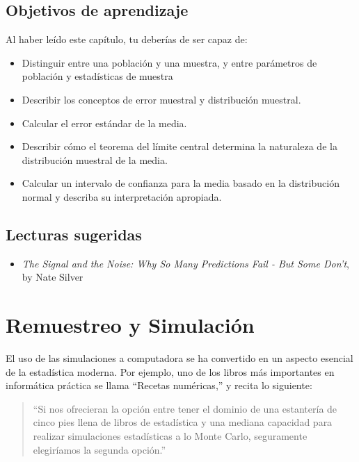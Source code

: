 \documentclass[
  12pt,
]{book}
\providecommand{\tightlist}{%
  \setlength{\itemsep}{0pt}\setlength{\parskip}{0pt}}
\theoremstyle{definition}
\theoremstyle{definition}
\theoremstyle{definition}
\theoremstyle{remark}
\begin{document}
\hypertarget{objetivos-de-aprendizaje}{%
\section{Objetivos de aprendizaje}\label{objetivos-de-aprendizaje}}

Al haber leído este capítulo, tu deberías de ser capaz de:

\begin{itemize}
\tightlist
\item
  Distinguir entre una población y una muestra, y entre parámetros de población y estadísticas de muestra
\item
  Describir los conceptos de error muestral y distribución muestral.
\item
  Calcular el error estándar de la media.
\item
  Describir cómo el teorema del límite central determina la naturaleza de la distribución muestral de la media.
\item
  Calcular un intervalo de confianza para la media basado en la distribución normal y describa su interpretación apropiada.
\end{itemize}

\hypertarget{lecturas-sugeridas}{%
\section{Lecturas sugeridas}\label{lecturas-sugeridas}}

\begin{itemize}
\tightlist
\item
  \emph{The Signal and the Noise: Why So Many Predictions Fail - But Some Don't}, by Nate Silver
\end{itemize}

\hypertarget{resampling-and-simulation}{%
\chapter{Remuestreo y Simulación}\label{resampling-and-simulation}}

El uso de las simulaciones a computadora se ha convertido en un aspecto esencial de la estadística moderna. Por ejemplo, uno de los libros más importantes en informática práctica se llama ``Recetas numéricas,'' y recita lo siguiente:

\begin{quote}
``Si nos ofrecieran la opción entre tener el dominio de una estantería de cinco pies llena de libros de estadística y una mediana capacidad para realizar simulaciones estadísticas a lo Monte Carlo, seguramente elegiríamos la segunda opción.''
\end{quote}
\end{document}
